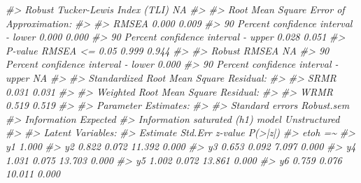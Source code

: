 \documentclass[
  11pt,
]{krantz}
\makeatletter
\newenvironment{Shaded}{\begin{snugshade}}{\end{snugshade}}
\newcommand{\CommentTok}[1]{\textcolor[rgb]{0.37,0.37,0.37}{\textit{#1}}}
\newenvironment{kframe}{%
\medskip{}
\setlength{\fboxsep}{.8em}
 \def\at@end@of@kframe{}%
 \ifinner\ifhmode%
  \def\at@end@of@kframe{\end{minipage}}%
  \begin{minipage}{\columnwidth}%
 \fi\fi%
 \def\FrameCommand##1{\hskip\@totalleftmargin \hskip-\fboxsep
 \colorbox{shadecolor}{##1}\hskip-\fboxsep
     \hskip-\linewidth \hskip-\@totalleftmargin \hskip\columnwidth}%
 \MakeFramed {\advance\hsize-\width
   \@totalleftmargin\z@ \linewidth\hsize
   \@setminipage}}%
 {\par\unskip\endMakeFramed%
 \at@end@of@kframe}
\renewenvironment{Shaded}{\begin{kframe}}{\end{kframe}}
\theoremstyle{definition}
\theoremstyle{definition}
\theoremstyle{definition}
\theoremstyle{definition}
\theoremstyle{remark}
\makeatother
\begin{document}
\begin{Shaded}
\begin{Highlighting}[]
\CommentTok{\#\textgreater{}   Robust Tucker{-}Lewis Index (TLI)                               NA}
\CommentTok{\#\textgreater{} }
\CommentTok{\#\textgreater{} Root Mean Square Error of Approximation:}
\CommentTok{\#\textgreater{} }
\CommentTok{\#\textgreater{}   RMSEA                                          0.000       0.009}
\CommentTok{\#\textgreater{}   90 Percent confidence interval {-} lower         0.000       0.000}
\CommentTok{\#\textgreater{}   90 Percent confidence interval {-} upper         0.028       0.051}
\CommentTok{\#\textgreater{}   P{-}value RMSEA \textless{}= 0.05                          0.999       0.944}
\CommentTok{\#\textgreater{}                                                                   }
\CommentTok{\#\textgreater{}   Robust RMSEA                                                  NA}
\CommentTok{\#\textgreater{}   90 Percent confidence interval {-} lower                     0.000}
\CommentTok{\#\textgreater{}   90 Percent confidence interval {-} upper                        NA}
\CommentTok{\#\textgreater{} }
\CommentTok{\#\textgreater{} Standardized Root Mean Square Residual:}
\CommentTok{\#\textgreater{} }
\CommentTok{\#\textgreater{}   SRMR                                           0.031       0.031}
\CommentTok{\#\textgreater{} }
\CommentTok{\#\textgreater{} Weighted Root Mean Square Residual:}
\CommentTok{\#\textgreater{} }
\CommentTok{\#\textgreater{}   WRMR                                           0.519       0.519}
\CommentTok{\#\textgreater{} }
\CommentTok{\#\textgreater{} Parameter Estimates:}
\CommentTok{\#\textgreater{} }
\CommentTok{\#\textgreater{}   Standard errors                           Robust.sem}
\CommentTok{\#\textgreater{}   Information                                 Expected}
\CommentTok{\#\textgreater{}   Information saturated (h1) model        Unstructured}
\CommentTok{\#\textgreater{} }
\CommentTok{\#\textgreater{} Latent Variables:}
\CommentTok{\#\textgreater{}                    Estimate  Std.Err  z{-}value  P(\textgreater{}|z|)}
\CommentTok{\#\textgreater{}   etoh =\textasciitilde{}                                             }
\CommentTok{\#\textgreater{}     y1                1.000                           }
\CommentTok{\#\textgreater{}     y2                0.822    0.072   11.392    0.000}
\CommentTok{\#\textgreater{}     y3                0.653    0.092    7.097    0.000}
\CommentTok{\#\textgreater{}     y4                1.031    0.075   13.703    0.000}
\CommentTok{\#\textgreater{}     y5                1.002    0.072   13.861    0.000}
\CommentTok{\#\textgreater{}     y6                0.759    0.076   10.011    0.000}

\end{Highlighting}
\end{Shaded}
\end{document}
